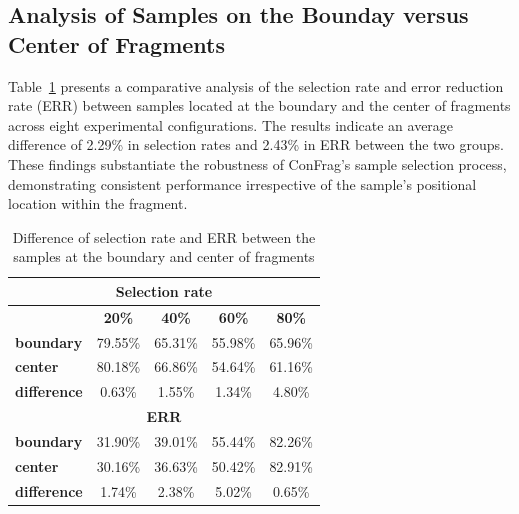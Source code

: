 \documentclass{article}
\theoremstyle{plain}
\theoremstyle{definition}
\theoremstyle{remark}
\begin{document}

\subsection{Analysis of Samples on the Bounday versus Center of Fragments}\label{subsec:boundary_center}
Table~\ref{tab:anal_boundary_centre} presents a comparative analysis of the selection rate and error reduction rate (ERR) between samples located at the boundary and the center of fragments across eight experimental configurations. 
The results indicate an average difference of 2.29\% in selection rates and 2.43\% in ERR between the two groups. 
These findings substantiate the robustness of ConFrag's sample selection process, demonstrating consistent performance irrespective of the sample's positional location within the fragment.

\begin{table}[t]
    \centering
    \caption{Difference of selection rate and ERR between the samples at the boundary and center of fragments}
    \begin{small}
    \begin{tabular}{lcccc}
    \toprule
    \multicolumn{5}{c}{\textbf{Selection rate}} \\
    \midrule
    \textbf{} & \textbf{20\%} & \textbf{40\%} & \textbf{60\%} & \textbf{80\%} \\
    \midrule
    \textbf{boundary} & 79.55\% & 65.31\% & 55.98\% & 65.96\% \\
    \textbf{center} & 80.18\% & 66.86\% & 54.64\% & 61.16\% \\
    \textbf{difference} & 0.63\% & 1.55\% & 1.34\% & 4.80\% \\
    \midrule
    \multicolumn{5}{c}{\textbf{ERR}} \\
    \midrule
    \textbf{boundary} & 31.90\% & 39.01\% & 55.44\% & 82.26\% \\
    \textbf{center} & 30.16\% & 36.63\% & 50.42\% & 82.91\% \\
    \textbf{difference} & 1.74\% & 2.38\% & 5.02\% & 0.65\% \\
    \bottomrule
    \end{tabular}
    \end{small}
    \label{tab:anal_boundary_centre}
\end{table}
\end{document}
